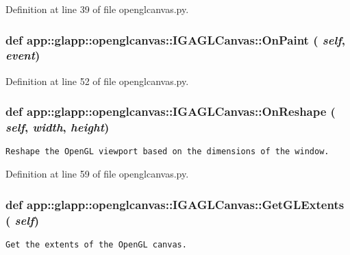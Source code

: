 Definition at line 39 of file openglcanvas.py.
\subsubsection{\setlength{\rightskip}{0pt plus 5cm}def app::glapp::openglcanvas::IGAGLCanvas::OnPaint ( {\em self},  {\em event})}\label{classapp_1_1glapp_1_1openglcanvas_1_1IGAGLCanvas_0d7785c6be64c614c668252d06a1da15}




Definition at line 52 of file openglcanvas.py.
\subsubsection{\setlength{\rightskip}{0pt plus 5cm}def app::glapp::openglcanvas::IGAGLCanvas::OnReshape ( {\em self},  {\em width},  {\em height})}\label{classapp_1_1glapp_1_1openglcanvas_1_1IGAGLCanvas_9565114bffb8d4c73a37276ae73c157b}




\footnotesize\begin{verbatim}
Reshape the OpenGL viewport based on the dimensions of the window.
\end{verbatim}
\normalsize
 

Definition at line 59 of file openglcanvas.py.
\subsubsection{\setlength{\rightskip}{0pt plus 5cm}def app::glapp::openglcanvas::IGAGLCanvas::GetGLExtents ( {\em self})}\label{classapp_1_1glapp_1_1openglcanvas_1_1IGAGLCanvas_2cbf3fffb1c453a6ace2e04cc96ac7be}




\footnotesize\begin{verbatim}Get the extents of the OpenGL canvas.\end{verbatim}
\normalsize
 

